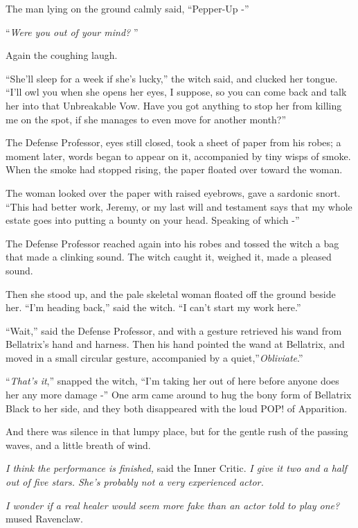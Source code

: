 The man lying on the ground calmly said, ``Pepper-Up -''

``\emph{Were you out of your mind?} ''

Again the coughing laugh.

``She'll sleep for a week if she's lucky,'' the witch said, and clucked
her tongue. ``I'll owl you when she opens her eyes, I suppose, so you
can come back and talk her into that Unbreakable Vow. Have you got
anything to stop her from killing me on the spot, if she manages to even
move for another month?''

The Defense Professor, eyes still closed, took a sheet of paper from his
robes; a moment later, words began to appear on it, accompanied by tiny
wisps of smoke. When the smoke had stopped rising, the paper floated
over toward the woman.

The woman looked over the paper with raised eyebrows, gave a sardonic
snort. ``This had better work, Jeremy, or my last will and testament
says that my whole estate goes into putting a bounty on your head.
Speaking of which -''

The Defense Professor reached again into his robes and tossed the witch
a bag that made a clinking sound. The witch caught it, weighed it, made
a pleased sound.

Then she stood up, and the pale skeletal woman floated off the ground
beside her. ``I'm heading back,'' said the witch. ``I can't start my
work here.''

``Wait,'' said the Defense Professor, and with a gesture retrieved his
wand from Bellatrix's hand and harness. Then his hand pointed the wand
at Bellatrix, and moved in a small circular gesture, accompanied by a
quiet,''\emph{Obliviate}.''

``\emph{That's it},'' snapped the witch, ``I'm taking her out of here
before anyone does her any more damage -'' One arm came around to hug
the bony form of Bellatrix Black to her side, and they both disappeared
with the loud POP! of Apparition.

And there was silence in that lumpy place, but for the gentle rush of
the passing waves, and a little breath of wind.

\emph{I think the performance is finished,} said the Inner Critic.
\emph{I give it two and a half out of five stars. She's probably not a
very experienced actor.}

\emph{I wonder if a real healer would seem more fake than an actor told
to play one?} mused Ravenclaw.

